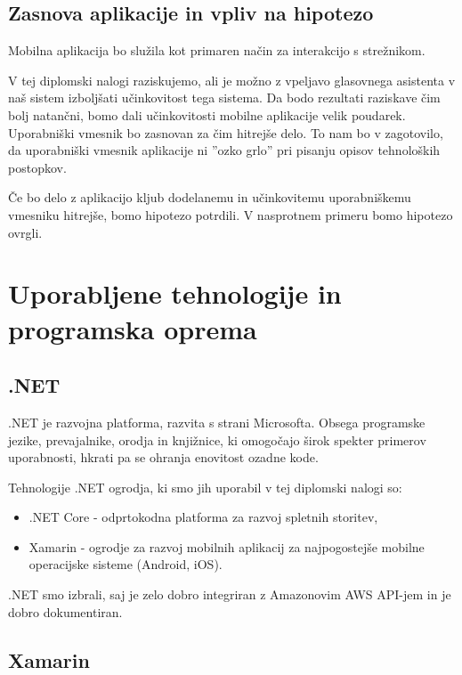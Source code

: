 \documentclass[a4paper, 12pt]{book}
\begin{document}
\subsection{Zasnova aplikacije in vpliv na hipotezo}

Mobilna aplikacija bo služila kot primaren način za interakcijo s strežnikom.

V tej diplomski nalogi raziskujemo, ali je možno z vpeljavo glasovnega asistenta v naš sistem izboljšati učinkovitost tega sistema.
Da bodo rezultati raziskave čim bolj natančni, bomo dali učinkovitosti mobilne aplikacije velik poudarek.
Uporabniški vmesnik bo zasnovan za čim hitrejše delo.
To nam bo v zagotovilo, da uporabniški vmesnik aplikacije ni ''ozko grlo'' pri pisanju opisov tehnoloških postopkov.

Če bo delo z aplikacijo kljub dodelanemu in učinkovitemu uporabniškemu vmesniku hitrejše, bomo hipotezo potrdili.
V nasprotnem primeru bomo hipotezo ovrgli.

\section{Uporabljene tehnologije in programska oprema}

\subsection{.NET}

.NET \cite{dotnet} je razvojna platforma, razvita s strani Microsofta.
Obsega programske jezike, prevajalnike, orodja in knjižnice, ki omogočajo širok spekter primerov uporabnosti, hkrati pa se ohranja enovitost ozadne kode.

Tehnologije .NET ogrodja, ki smo jih uporabil v tej diplomski nalogi so:
\begin{itemize}
	\item .NET Core - odprtokodna platforma za razvoj spletnih storitev,
	\item Xamarin - ogrodje za razvoj mobilnih aplikacij za najpogostejše mobilne operacijske sisteme (Android, iOS).
\end{itemize}

.NET smo izbrali, saj je zelo dobro integriran z Amazonovim AWS API-jem in je dobro dokumentiran.

\subsection{Xamarin}
\end{document}
